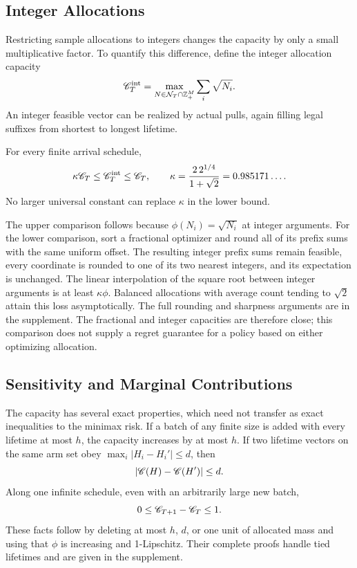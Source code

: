 \subsection{Integer Allocations}
Restricting sample allocations to integers changes the capacity by only a small multiplicative factor. To quantify this difference, define the integer allocation capacity
\[
 \mathscr C_T^{\mathrm{int}}=
 \max_{N\in\mathcal N_T\cap\mathbb Z_+^M}\sum_i\sqrt{N_i}.
\]
An integer feasible vector can be realized by actual pulls, again filling legal suffixes from shortest to longest lifetime.

\begin{theorem}\label{thm:integer-main}
For every finite arrival schedule,
\begin{equation}\label{eq:integer-main}
 \kappa\mathscr C_T\le\mathscr C_T^{\mathrm{int}}\le\mathscr C_T,
 \qquad \kappa=\frac{2\,2^{1/4}}{1+\sqrt2}=0.985171\ldots.
\end{equation}
No larger universal constant can replace $\kappa$ in the lower bound.
\end{theorem}

The upper comparison follows because $\phi(N_i)=\sqrt{N_i}$ at integer arguments. For the lower comparison, sort a fractional optimizer and round all of its prefix sums with the same uniform offset. The resulting integer prefix sums remain feasible, every coordinate is rounded to one of its two nearest integers, and its expectation is unchanged. The linear interpolation of the square root between integer arguments is at least $\kappa\phi$. Balanced allocations with average count tending to $\sqrt2$ attain this loss asymptotically. The full rounding and sharpness arguments are in the supplement. The fractional and integer capacities are therefore close; this comparison does not supply a regret guarantee for a policy based on either optimizing allocation.

\subsection{Sensitivity and Marginal Contributions}
The capacity has several exact properties, which need not transfer as exact inequalities to the minimax risk. If a batch of any finite size is added with every lifetime at most $h$, the capacity increases by at most $h$. If two lifetime vectors on the same arm set obey $\max_i|H_i-H_i'|\le d$, then
\begin{equation}\label{eq:jitter}
 |\mathscr C(H)-\mathscr C(H')|\le d.
\end{equation}
Along one infinite schedule, even with an arbitrarily large new batch,
\begin{equation}\label{eq:capacity-growth}
 0\le\mathscr C_{T+1}-\mathscr C_T\le1.
\end{equation}
These facts follow by deleting at most $h$, $d$, or one unit of allocated mass and using that $\phi$ is increasing and 1-Lipschitz. Their complete proofs handle tied lifetimes and are given in the supplement.

